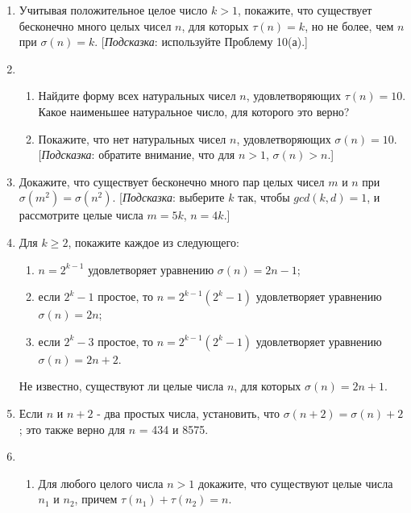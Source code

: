 \documentclass[11pt]{article}
\begin{document}
\begin{enumerate}
\begin{enumerate}
			\item  Если $n > 1$ является составным числом, то $\sigma(n)>n + \sqrt{n}$. [{\itshape Подсказка}: Пусть $d\mid n$, где $1 < d < n$, поэтому $1 < n\mid d < n$. Если $d \le \sqrt{n}$, то $n\mid d \ge \sqrt{n}$.]
		\end{enumerate}
		\item Учитывая положительное целое число $k > 1$, покажите, что существует бесконечно много целых чисел $n$, для которых $\tau(n)=k$, но не более, чем $n$ при $\sigma(n)=k$. [{\itshape Подсказка}: используйте Проблему 10(а).]
		\item 
		\begin{enumerate} 
			\item Найдите форму всех натуральных чисел $n$, удовлетворяющих $\tau(n) = 10$. Какое наименьшее натуральное число, для которого это верно?
			\item Покажите, что нет натуральных чисел $n$, удовлетворяющих $\sigma(n) = 10$. [{\itshape Подсказка}: обратите внимание, что для $n > 1$, $\sigma(n) > n$.]
		\end{enumerate}
		\item Докажите, что существует бесконечно много пар целых чисел $m$ и $n$ при $\sigma(m^{2}) = \sigma(n^{2}).$ [{\itshape Подсказка}: выберите $k$ так, чтобы $gcd(k,d) = 1$, и рассмотрите целые числа $m = 5k$, $n = 4k$.]
		\item Для $k\ge 2 $, покажите каждое из следующего:
		\begin{enumerate} 
			\item $n = 2^{k-1}$ удовлетворяет уравнению $\sigma(n) = 2n - 1$;
			\item если $2^{k}-1$ простое, то $n = 2^{k-1}\left(2^{k}-1\right)$ удовлетворяет уравнению $\sigma(n) = 2n$;
			\item если $2^{k} - 3$ простое, то $n = 2^{k-1}\left(2^{k}-1\right)$ удовлетворяет уравнению $\sigma(n) = 2n+2$. 
		\end{enumerate}
		Не известно, существуют ли целые числа $n$, для которых $\sigma(n) = 2n + 1$.
		\item Если $n$ и $n+2$ - два простых числа, установить, что $\sigma (n+2) = \sigma (n)+2$; это также верно для $n$ = 434 и 8575.
		\item 
		\begin{enumerate} 
			\item Для любого целого числа $n > 1$ докажите, что существуют целые числа $n_{1}$ и $n_{2}$, причем $\tau(n_{1})+\tau(n_{2}) = n$.

\end{enumerate}
\end{enumerate}
\end{document}
